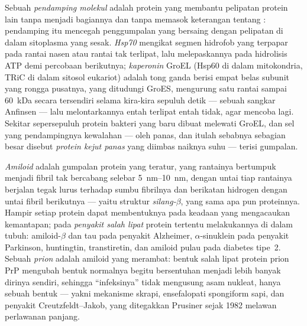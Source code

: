 \begin{definition}[Pendamping]\label{def:b3:structural-biology:chaperones}
Sebuah \emph{pendamping molekul} adalah protein yang membantu pelipatan
protein lain tanpa menjadi bagiannya dan tanpa memasok keterangan tentang
: pendamping itu mencegah penggumpalan yang bersaing dengan
pelipatan di dalam sitoplasma yang sesak. \emph{Hsp70} mengikat segmen
hidrofob yang terpapar pada rantai nasen atau rantai tak terlipat, lalu
melepaskannya pada hidrolisis ATP demi percobaan berikutnya; \emph{kaperonin}
GroEL (Hsp60 di dalam mitokondria, TRiC di dalam sitosol eukariot) adalah tong
ganda berisi empat belas subunit yang rongga pusatnya, yang ditudungi GroES,
mengurung satu rantai sampai \qty{60}{kDa} secara tersendiri selama kira-kira
sepuluh detik --- sebuah sangkar Anfinsen --- lalu melontarkannya entah
terlipat entah tidak, agar mencoba lagi. Sekitar sepersepuluh protein bakteri
yang baru dibuat melewati GroEL, dan sel yang pendampingnya kewalahan --- oleh
panas, dan itulah sebabnya sebagian besar disebut \emph{protein kejut panas}
yang diimbas naiknya suhu --- terisi gumpalan.
\end{definition}

\begin{definition}[Amiloid]\label{def:b3:structural-biology:amyloid}
\emph{Amiloid} adalah gumpalan protein yang teratur, yang rantainya bertumpuk
menjadi fibril tak bercabang selebar \qtyrange{5}{10}{nm}, dengan untai tiap
rantainya berjalan tegak lurus terhadap sumbu fibrilnya dan berikatan hidrogen
dengan untai fibril berikutnya --- yaitu struktur \emph{silang-$\beta$}, yang
sama apa pun proteinnya. Hampir setiap protein dapat membentuknya pada keadaan
yang mengacaukan kemantapan; pada \emph{penyakit salah lipat} protein tertentu
melakukannya di dalam tubuh: amiloid-$\beta$ dan tau pada penyakit Alzheimer,
$\alpha$-sinuklein pada penyakit Parkinson, huntingtin, transtiretin, dan
amiloid pulau pada diabetes tipe~2. Sebuah \emph{prion} adalah amiloid yang
merambat: bentuk salah lipat protein prion PrP mengubah bentuk normalnya
begitu bersentuhan menjadi lebih banyak dirinya sendiri, sehingga
``infeksinya'' tidak mengusung asam nukleat, hanya sebuah bentuk --- yakni
mekanisme skrapi, ensefalopati spongiform sapi, dan penyakit
Creutzfeldt--Jakob, yang ditegakkan Prusiner sejak 1982 melawan perlawanan panjang.
\end{definition}


